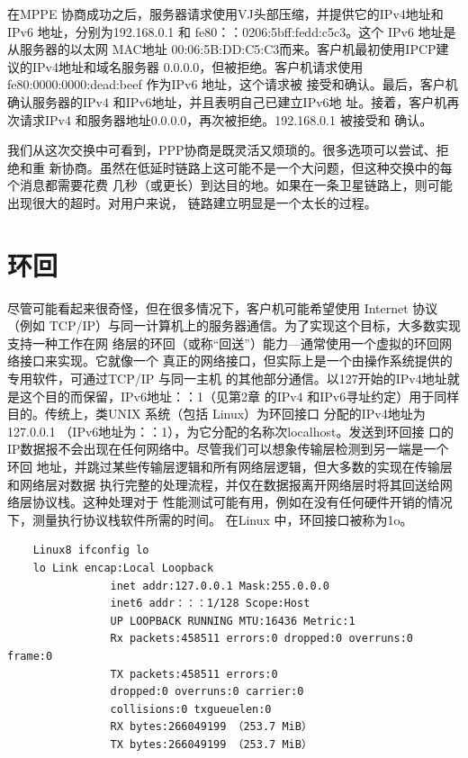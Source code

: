 在MPPE 协商成功之后，服务器请求使用VJ头部压缩，并提供它的IPv4地址和IPv6
地址，分别为192.168.0.1 和 fe80：：0206:5bff:fedd:c5c3。这个 IPv6 地址是从服务器的以太网
MAC地址 00:06:5B:DD:C5:C3而来。客户机最初使用IPCP建议的IPv4地址和域名服务器
0.0.0.0，但被拒绝。客户机请求使用 fe80:0000:0000:dead:beef 作为IPv6 地址，这个请求被
接受和确认。最后，客户机确认服务器的IPv4 和IPv6地址，并且表明自己已建立IPv6地
址。接着，客户机再次请求IPv4 和服务器地址0.0.0.0，再次被拒绝。192.168.0.1 被接受和
确认。

我们从这次交换中可看到，PPP协商是既灵活又烦琐的。很多选项可以尝试、拒绝和重
新协商。虽然在低延时链路上这可能不是一个大问题，但这种交换中的每个消息都需要花费
几秒（或更长）到达目的地。如果在一条卫星链路上，则可能出现很大的超时。对用户来说，
链路建立明显是一个太长的过程。

\section{环回}

尽管可能看起来很奇怪，但在很多情况下，客户机可能希望使用 Internet 协议（例如
TCP/IP）与同一计算机上的服务器通信。为了实现这个目标，大多数实现支持一种工作在网
络层的环回（或称“回送”）能力—通常使用一个虚拟的环回网络接口来实现。它就像一个
真正的网络接口，但实际上是一个由操作系统提供的专用软件，可通过TCP/IP 与同一主机
的其他部分通信。以127开始的IPv4地址就是这个目的而保留，IPv6地址：：1（见第2章
的IPv4 和IPv6寻址约定）用于同样目的。传统上，类UNIX 系统（包括 Linux）为环回接口
分配的IPv4地址为127.0.0.1 （IPv6地址为：：1），为它分配的名称次localhost。发送到环回接
口的IP数据报不会出现在任何网络中。尽管我们可以想象传输层检测到另一端是一个环回
地址，并跳过某些传输层逻辑和所有网络层逻辑，但大多数的实现在传输层和网络层对数据
执行完整的处理流程，并仅在数据报离开网络层时将其回送给网络层协议栈。这种处理对于
性能测试可能有用，例如在没有任何硬件开销的情况下，测量执行协议栈软件所需的时间。
在Linux 中，环回接口被称为1o。

\begin{verbatim}
    Linux8 ifconfig lo
    lo Link encap:Local Loopback
                inet addr:127.0.0.1 Mask:255.0.0.0
                inet6 addr：：：1/128 Scope:Host
                UP LOOPBACK RUNNING MTU:16436 Metric:1
                Rx packets:458511 errors:0 dropped:0 overruns:0 frame:0
                TX packets:458511 errors:0
                dropped:0 overruns:0 carrier:0
                collisions:0 txgueuelen:0
                RX bytes:266049199 （253.7 MiB）
                TX bytes:266049199 （253.7 MiB）
\end{verbatim}

